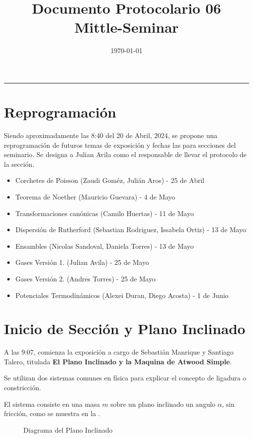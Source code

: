 \documentclass{article}
\title{\textbf{Documento Protocolario 06}\\ \small{Mittle-Seminar}}
\date{\today}
\theoremstyle{definition}
\begin{document}
\maketitle
\thispagestyle{fancy}
\hrule

\section{Reprogramación}
Siendo aproximadamente las 8:40 del 20 de Abril, 2024, se propone una reprogramación de futuros temas de exposición y fechas las para secciones del seminario. Se designa a Julian Avila como el responsable de llevar el protocolo de la sección.

\begin{itemize}
	\item Corchetes de Poisson (Zaudi Goméz, Julián Aros) - 25 de Abril
	\item Teorema de Noether (Mauricio Guevara) - 4 de Mayo
	\item Transformaciones canónicas (Camilo Huertas) - 11 de Mayo
	\item Dispersión de Rutherford (Sebastian Rodriguez, Issabela Ortiz) - 13 de Mayo
	\item Ensambles (Nicolas Sandoval, Daniela Torres) - 13 de Mayo
	\item Gases Versión 1. (Julian Avila) - 25 de Mayo
	\item Gases Versión 2. (Andres Torres) - 25 de Mayo
	\item Potenciales Termodinámicos (Alexei Duran, Diego Acosta) - 1 de Junio
\end{itemize}

\section{Inicio de Sección y Plano Inclinado}
A las 9:07, comienza la exposición a cargo de Sebastián Manrique y Santiago Talero, titulada \textbf{El Plano Inclinado y la Maquina de Atwood Simple}.

Se utilizan dos sistemas comunes en física para explicar el concepto de ligadura o constricción.

El sistema consiste en una masa $m$ sobre un plano inclinado un angulo $\alpha$, sin fricción, como se muestra en la .


\begin{figure}[htbp!]
	\caption{Diagrama del Plano Inclinado}
	\label{fig:inclained_plane}
\end{figure}
\end{document}
